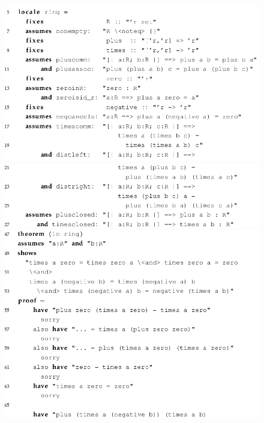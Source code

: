\begin{figure}[H]
\begin{center}
\includegraphics[scale=0.45]{Figures/Background/ringskel1.png}
\includegraphics[scale=0.45]{Figures/Background/ringskel2.png}
\includegraphics[scale=0.45]{Figures/Background/ringskel3.png}
\end{center}
\end{figure}

